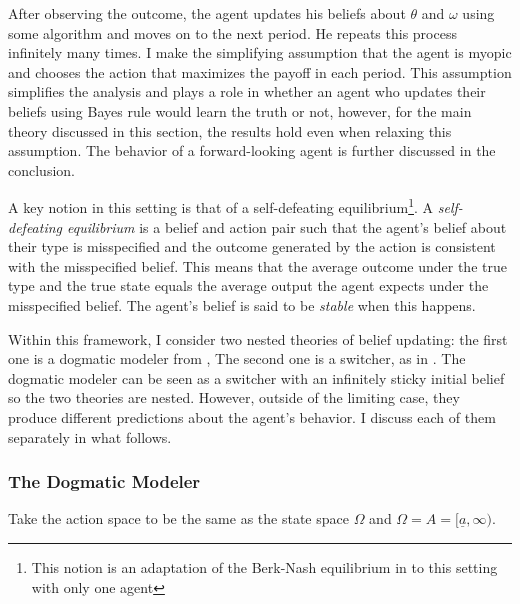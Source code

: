 \documentclass[
  12pt,
]{article}
\begin{document}
After observing the outcome, the agent updates his beliefs about
\(\theta\) and \(\omega\) using some algorithm and moves on to the next
period. He repeats this process infinitely many times. I make the
simplifying assumption that the agent is myopic and chooses the action
that maximizes the payoff in each period. This assumption simplifies the
analysis and plays a role in whether an agent who updates their beliefs
using Bayes rule would learn the truth or not, however, for the main
theory discussed in this section, the results hold even when relaxing
this assumption. The behavior of a forward-looking agent is further
discussed in the conclusion.

A key notion in this setting is that of a self-defeating
equilibrium\footnote{This notion is an adaptation of the Berk-Nash equilibrium in 
\citet{Esponda2016} to this setting with only one agent}. A
\emph{self-defeating equilibrium} is a belief and action pair such that
the agent's belief about their type is misspecified and the outcome
generated by the action is consistent with the misspecified belief. This
means that the average outcome under the true type and the true state
equals the average output the agent expects under the misspecified
belief. The agent's belief is said to be \emph{stable} when this
happens.

Within this framework, I consider two nested theories of belief
updating: the first one is a dogmatic modeler from \citet{Heidhues2018},
The second one is a switcher, as in \citet{Ba2023}. The dogmatic modeler
can be seen as a switcher with an infinitely sticky initial belief so
the two theories are nested. However, outside of the limiting case, they
produce different predictions about the agent's behavior. I discuss each
of them separately in what follows.

\hypertarget{the-dogmatic-modeler}{%
\subsubsection{The Dogmatic Modeler}\label{the-dogmatic-modeler}}

Take the action space to be the same as the state space \(\Omega\) and
\(\Omega =A=[\underline{a}, \infty)\).
\end{document}
